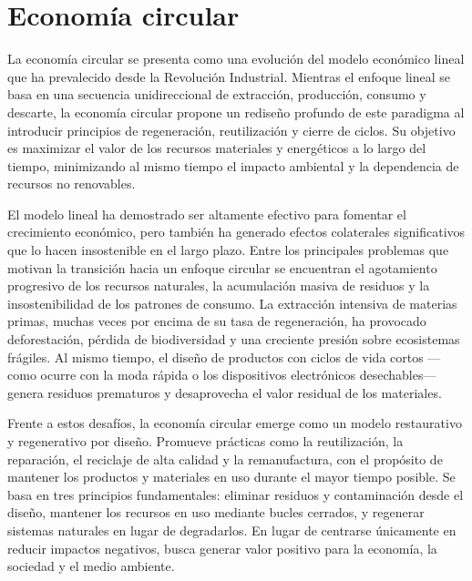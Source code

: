 \section{Economía circular}

La economía circular se presenta como una evolución del modelo económico lineal que ha prevalecido desde la Revolución Industrial. Mientras el enfoque lineal se basa en una secuencia unidireccional de extracción, producción, consumo y descarte, la economía circular propone un rediseño profundo de este paradigma al introducir principios de regeneración, reutilización y cierre de ciclos. Su objetivo es maximizar el valor de los recursos materiales y energéticos a lo largo del tiempo, minimizando al mismo tiempo el impacto ambiental y la dependencia de recursos no renovables.

El modelo lineal ha demostrado ser altamente efectivo para fomentar el crecimiento económico, pero también ha generado efectos colaterales significativos que lo hacen insostenible en el largo plazo. Entre los principales problemas que motivan la transición hacia un enfoque circular se encuentran el agotamiento progresivo de los recursos naturales, la acumulación masiva de residuos y la insostenibilidad de los patrones de consumo. La extracción intensiva de materias primas, muchas veces por encima de su tasa de regeneración, ha provocado deforestación, pérdida de biodiversidad y una creciente presión sobre ecosistemas frágiles. Al mismo tiempo, el diseño de productos con ciclos de vida cortos —como ocurre con la moda rápida o los dispositivos electrónicos desechables— genera residuos prematuros y desaprovecha el valor residual de los materiales. %

Frente a estos desafíos, la economía circular emerge como un modelo restaurativo y regenerativo por diseño. Promueve prácticas como la reutilización, la reparación, el reciclaje de alta calidad y la remanufactura, con el propósito de mantener los productos y materiales en uso durante el mayor tiempo posible. Se basa en tres principios fundamentales: eliminar residuos y contaminación desde el diseño, mantener los recursos en uso mediante bucles cerrados, y regenerar sistemas naturales en lugar de degradarlos. En lugar de centrarse únicamente en reducir impactos negativos, busca generar valor positivo para la economía, la sociedad y el medio ambiente.

